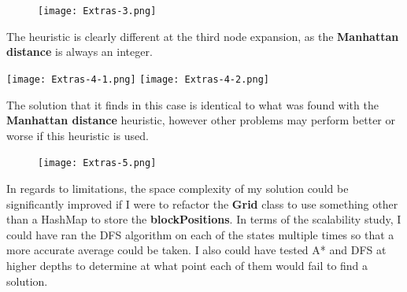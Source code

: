 \documentclass{article}
\begin{document}
	\begin{figure}[h]	
		\centering
		\texttt{[image: Extras-3.png]}
	\end{figure}

	The heuristic is clearly different at the third node expansion, as the \textbf{Manhattan distance} is always an integer.
	\begin{multicols}{2}[\columnsep=2cm]
		\texttt{[image: Extras-4-1.png]}
		\columnbreak
		\texttt{[image: Extras-4-2.png]}
	\end{multicols}

	\newpage
	The solution that it finds in this case is identical to what was found with the \textbf{Manhattan distance} heuristic, however other problems may perform better or worse if this heuristic is used.
	\begin{figure}[h]	
		\centering
		\texttt{[image: Extras-5.png]}
	\end{figure}

	In regards to limitations, the space complexity of my solution could be significantly improved if I were to refactor the \textbf{Grid} class to use something other than a HashMap to store the \textbf{blockPositions}. In terms of the scalability study, I could have ran the DFS algorithm on each of the states multiple times so that a more accurate average could be taken. I also could have tested A* and DFS at higher depths to determine at what point each of them would fail to find a solution.
	
\end{document}
